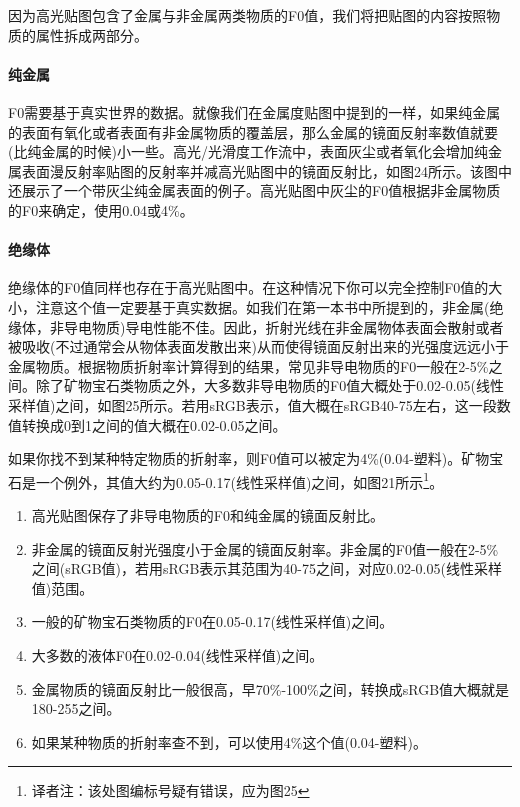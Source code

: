 因为高光贴图包含了金属与非金属两类物质的F0值，我们将把贴图的内容按照物质的属性拆成两部分。

\paragraph{纯金属}

F0需要基于真实世界的数据。就像我们在金属度贴图中提到的一样，如果纯金属的表面有氧化或者表面有非金属物质的覆盖层，那么金属的镜面反射率数值就要(比纯金属的时候)小一些。高光/光滑度工作流中，表面灰尘或者氧化会增加纯金属表面漫反射率贴图的反射率并减高光贴图中的镜面反射比，如图24所示。该图中还展示了一个带灰尘纯金属表面的例子。高光贴图中灰尘的F0值根据非金属物质的F0来确定，使用0.04或4\%。

\paragraph{绝缘体}

绝缘体的F0值同样也存在于高光贴图中。在这种情况下你可以完全控制F0值的大小，注意这个值一定要基于真实数据。如我们在第一本书中所提到的，非金属(绝缘体，非导电物质)导电性能不佳。因此，折射光线在非金属物体表面会散射或者被吸收(不过通常会从物体表面发散出来)从而使得镜面反射出来的光强度远远小于金属物质。根据物质折射率计算得到的结果，常见非导电物质的F0一般在2-5\%之间。除了矿物宝石类物质之外，大多数非导电物质的F0值大概处于0.02-0.05(线性采样值)之间，如图25所示。若用sRGB表示，值大概在sRGB40-75左右，这一段数值转换成0到1之间的值大概在0.02-0.05之间。

如果你找不到某种特定物质的折射率，则F0值可以被定为4\%(0.04-塑料)。矿物宝石是一个例外，其值大约为0.05-0.17(线性采样值)之间，如图21所示\footnote{译者注：该处图编标号疑有错误，应为图25}。

\begin{enumerate}
\item 高光贴图保存了非导电物质的F0和纯金属的镜面反射比。
\item 非金属的镜面反射光强度小于金属的镜面反射率。非金属的F0值一般在2-5\%之间(sRGB值)，若用sRGB表示其范围为40-75之间，对应0.02-0.05(线性采样值)范围。
\item 一般的矿物宝石类物质的F0在0.05-0.17(线性采样值)之间。
\item 大多数的液体F0在0.02-0.04(线性采样值)之间。
\item 金属物质的镜面反射比一般很高，早70\%-100\%之间，转换成sRGB值大概就是180-255之间。
\item 如果某种物质的折射率查不到，可以使用4\%这个值(0.04-塑料)。
\end{enumerate}

